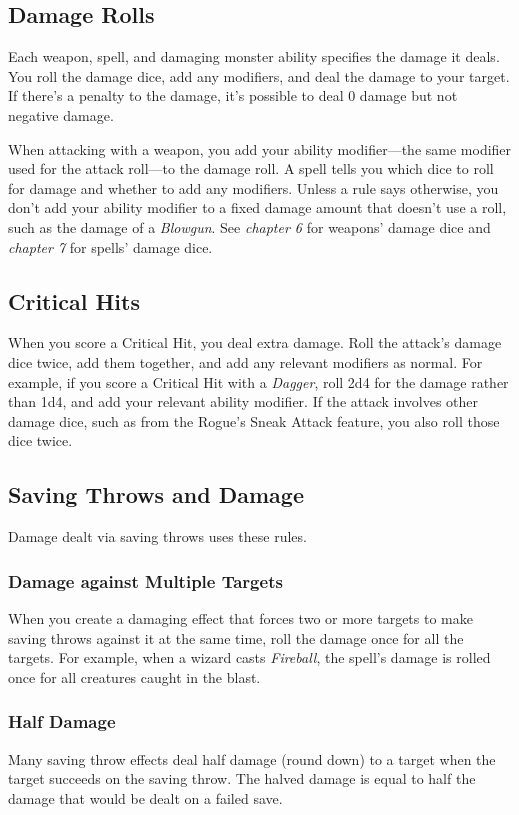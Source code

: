 \documentclass[10pt,a4paper,twoside,bg=print,twocolumn,openany,nodeprecatedcode]{dndbook}
\begin{document}
\subsection{Damage Rolls}
Each weapon, spell, and damaging monster ability specifies the damage it deals. You roll the damage dice, add any modifiers, and deal the damage to your target. If there's a penalty to the damage, it's possible to deal 0 damage but not negative damage.

When attacking with a weapon, you add your ability modifier—the same modifier used for the attack roll—to the damage roll. A spell tells you which dice to roll for damage and whether to add any modifiers. Unless a rule says otherwise, you don't add your ability modifier to a fixed damage amount that doesn't use a roll, such as the damage of a \textit{Blowgun}. See \textit{chapter 6} for weapons' damage dice and \textit{chapter 7} for spells' damage dice.

\subsection{Critical Hits}
When you score a Critical Hit, you deal extra damage. Roll the attack's damage dice twice, add them together, and add any relevant modifiers as normal. For example, if you score a Critical Hit with a \textit{Dagger}, roll 2d4 for the damage rather than 1d4, and add your relevant ability modifier. If the attack involves other damage dice, such as from the Rogue's Sneak Attack feature, you also roll those dice twice.

\subsection{Saving Throws and Damage}
Damage dealt via saving throws uses these rules.

\subsubsection{Damage against Multiple Targets}
When you create a damaging effect that forces two or more targets to make saving throws against it at the same time, roll the damage once for all the targets. For example, when a wizard casts \textit{Fireball}, the spell's damage is rolled once for all creatures caught in the blast.

\subsubsection{Half Damage}
Many saving throw effects deal half damage (round down) to a target when the target succeeds on the saving throw. The halved damage is equal to half the damage that would be dealt on a failed save.
\end{document}
